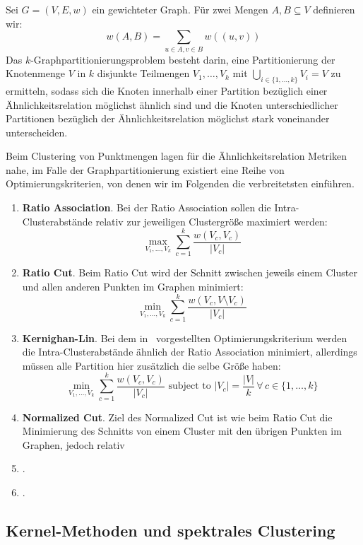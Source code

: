\begin{definition}[$k$-Graphpartitionierung]
	Sei $G=(V,E,w)$ ein gewichteter Graph. Für zwei Mengen $A, B \subseteq V$ definieren wir:
	\[ w(A,B) = \sum_{u \in A, v \in B} w((u,v)) \]
	Das $k$-Graphpartitionierungsproblem besteht darin, eine Partitionierung der Knotenmenge $V$ in $k$ disjunkte Teilmengen
	$V_1, \dots, V_k$ mit $\bigcup_{i \in \{1, \dots, k \}} V_i = V$ zu ermitteln, sodass sich die Knoten innerhalb einer
	Partition bezüglich einer Ähnlichkeitsrelation möglichst ähnlich sind und die Knoten unterschiedlicher Partitionen
	bezüglich der Ähnlichkeitsrelation möglichst stark voneinander unterscheiden.
	
	Beim Clustering von Punktmengen lagen für die Ähnlichkeitsrelation Metriken nahe, im Falle der Graphpartitionierung
	existiert eine Reihe von Optimierungskriterien, von denen wir im Folgenden die verbreitetsten einführen.
	
	\begin{enumerate}
		\item 	\textbf{Ratio Association}. Bei der Ratio Association sollen die Intra-Clusterabstände relativ zur jeweiligen
				Clustergröße maximiert werden:
				\[ \max_{V_1, \dots, V_k} \sum_{c=1}^{k} \frac{w(V_c, V_c)}{\left|V_c\right|} \]
		\item 	\textbf{Ratio Cut}. Beim Ratio Cut wird der Schnitt zwischen jeweils einem Cluster und allen anderen Punkten
				im Graphen minimiert:
				\[ \min_{V_1, \dots, V_k} \sum_{c=1}^{k} \frac{w(V_c, V \setminus V_c)}{\left|V_c\right|} \]
		\item 	\textbf{Kernighan-Lin}. Bei dem in~\cite{KernighanL70} vorgestellten Optimierungskriterium werden die
				Intra-Clusterabstände ähnlich der Ratio Association minimiert, allerdings müssen alle Partition hier zusätzlich
				die selbe Größe haben:
				\[ \min_{V_1, \dots, V_k} \sum_{c=1}^{k} \frac{w(V_c, V_c)}{\left|V_c\right|} \textrm{ subject to } 
				   \left|V_c\right| = \frac{\left|V\right|}{k} \, \forall \, c \in \{ 1, \dots, k \} \]
		\item 	\textbf{Normalized Cut}. Ziel des Normalized Cut ist wie beim Ratio Cut die Minimierung des Schnitts von einem
				Cluster mit den übrigen Punkten im Graphen, jedoch relativ 
		\item 	\textbf{}. 
		\item 	\textbf{}. 
	\end{enumerate}
\end{definition}

\subsection{Kernel-Methoden und spektrales Clustering}
\label{subsection:basics:kernel-spectral}